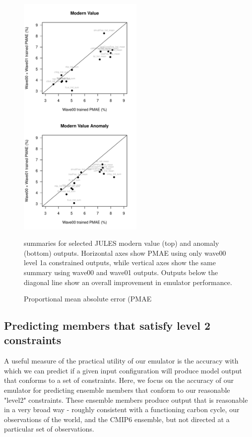 \documentclass[gmd, manuscript]{copernicus}
\begin{document}
%
\begin{figure}[t]
\includegraphics[width=6cm]{./figs/PMAE_comparison.pdf}
\caption{Proportional mean absolute error (PMAE} summaries for selected JULES modern value (top) and anomaly (bottom) outputs. Horizontal axes show PMAE using only wave00 level 1a constrained outputs, while vertical axes show the same summary using wave00 and wave01 outputs. Outputs below the diagonal line show an overall improvement in emulator performance. 
\label{fig:PMAE_comparison}
\end{figure}

\subsection{Predicting members that satisfy level 2 constraints}\label{app:level_2_pred} 

A useful measure of the practical utility of our emulator is the accuracy with which we can predict if a given input configuration will produce model output that conforms to a set of constraints. Here, we focus on the accuracy of our emulator for predicting ensemble members that conform to our reasonable "level2" constraints. These ensemble members produce output that is reasonable in a very broad way - roughly consistent with a functioning carbon cycle, our observations of the world, and the CMIP6 ensemble, but not directed at a particular set of observations.
\end{document}
